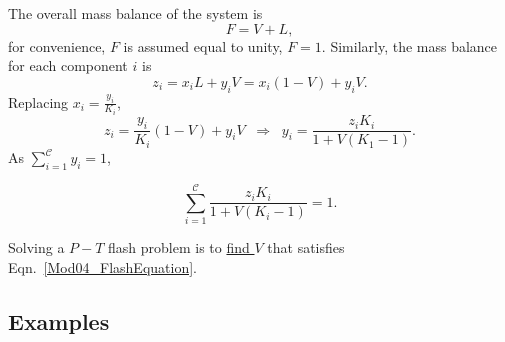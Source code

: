 \documentclass[12pts,a4paper,amsmath,amssymb,floatfix]{article}%
\newcommand{\frc}{\displaystyle\frac}
\newcommand{\summation}[3][error]{\sum\limits_{#2}^{#3}#1}
\begin{document}
      The overall mass balance of the system is
         \begin{displaymath}
             F = V + L,
         \end{displaymath}
         for convenience, $F$ is assumed equal to unity, $F=1$. Similarly, the mass balance for each component $i$ is
         \begin{displaymath}
            z_{i} = x_{i}L + y_{i}V = x_{i}\left(1-V\right) + y_{i}V.
         \end{displaymath}
         Replacing $x_{i} = \frc{y_{i}}{K_{i}}$,
         \begin{displaymath}
           z_{i} = \frc{y_{i}}{K_{i}}\left(1-V\right) + y_{i}V \;\;\Longrightarrow \;\;y_{i} = \frc{z_{i}K_{i}}{1+V\left(K_{1}-1\right)}. 
         \end{displaymath}
         As $\summation[y_{i}]{i=1}{\mathcal{C}} = 1$,
         \begin{shaded}
           \begin{equation}
              \summation[\frc{z_{i}K_{i}}{1+V\left(K_{i}-1\right)}]{i=1}{\mathcal{C}} = 1.\label{Mod04_FlashEquation} 
           \end{equation}
         \end{shaded}
         Solving a $P-T$ flash problem is to \underline{find $V$} that satisfies Eqn.~\ref{Mod04_FlashEquation}.
      
\clearpage

\subsection{Examples}
\end{document}
